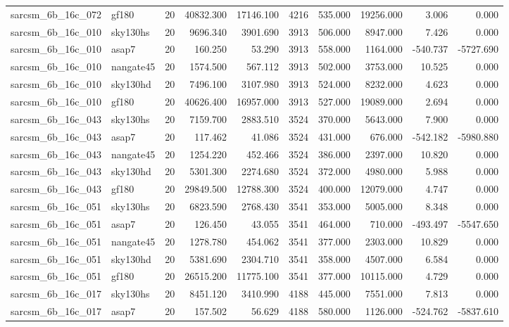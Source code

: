 \begin{tabular}{llrrrrrrrr}
sarcsm\_6b\_16c\_072 & gf180 & 20 & 40832.300 & 17146.100 & 4216 & 535.000 & 19256.000 & 3.006 & 0.000 \\
sarcsm\_6b\_16c\_010 & sky130hs & 20 & 9696.340 & 3901.690 & 3913 & 506.000 & 8947.000 & 7.426 & 0.000 \\
sarcsm\_6b\_16c\_010 & asap7 & 20 & 160.250 & 53.290 & 3913 & 558.000 & 1164.000 & -540.737 & -5727.690 \\
sarcsm\_6b\_16c\_010 & nangate45 & 20 & 1574.500 & 567.112 & 3913 & 502.000 & 3753.000 & 10.525 & 0.000 \\
sarcsm\_6b\_16c\_010 & sky130hd & 20 & 7496.100 & 3107.980 & 3913 & 524.000 & 8232.000 & 4.623 & 0.000 \\
sarcsm\_6b\_16c\_010 & gf180 & 20 & 40626.400 & 16957.000 & 3913 & 527.000 & 19089.000 & 2.694 & 0.000 \\
sarcsm\_6b\_16c\_043 & sky130hs & 20 & 7159.700 & 2883.510 & 3524 & 370.000 & 5643.000 & 7.900 & 0.000 \\
sarcsm\_6b\_16c\_043 & asap7 & 20 & 117.462 & 41.086 & 3524 & 431.000 & 676.000 & -542.182 & -5980.880 \\
sarcsm\_6b\_16c\_043 & nangate45 & 20 & 1254.220 & 452.466 & 3524 & 386.000 & 2397.000 & 10.820 & 0.000 \\
sarcsm\_6b\_16c\_043 & sky130hd & 20 & 5301.300 & 2274.680 & 3524 & 372.000 & 4980.000 & 5.988 & 0.000 \\
sarcsm\_6b\_16c\_043 & gf180 & 20 & 29849.500 & 12788.300 & 3524 & 400.000 & 12079.000 & 4.747 & 0.000 \\
sarcsm\_6b\_16c\_051 & sky130hs & 20 & 6823.590 & 2768.430 & 3541 & 353.000 & 5005.000 & 8.348 & 0.000 \\
sarcsm\_6b\_16c\_051 & asap7 & 20 & 126.450 & 43.055 & 3541 & 464.000 & 710.000 & -493.497 & -5547.650 \\
sarcsm\_6b\_16c\_051 & nangate45 & 20 & 1278.780 & 454.062 & 3541 & 377.000 & 2303.000 & 10.829 & 0.000 \\
sarcsm\_6b\_16c\_051 & sky130hd & 20 & 5381.690 & 2304.710 & 3541 & 358.000 & 4507.000 & 6.584 & 0.000 \\
sarcsm\_6b\_16c\_051 & gf180 & 20 & 26515.200 & 11775.100 & 3541 & 377.000 & 10115.000 & 4.729 & 0.000 \\
sarcsm\_6b\_16c\_017 & sky130hs & 20 & 8451.120 & 3410.990 & 4188 & 445.000 & 7551.000 & 7.813 & 0.000 \\
sarcsm\_6b\_16c\_017 & asap7 & 20 & 157.502 & 56.629 & 4188 & 580.000 & 1126.000 & -524.762 & -5837.610 \\

\end{tabular}
